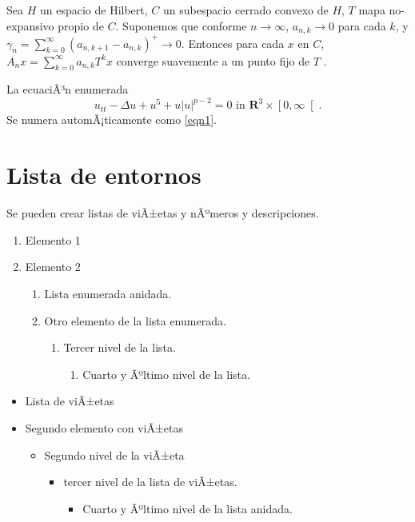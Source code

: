 \documentclass[11pt,spanish]{report}
\begin{document}
Sea $H$ un espacio de Hilbert, $C$ un subespacio cerrado convexo de $H$, $T$
mapa no-expansivo propio de $C$. Suponemos que conforme $n\rightarrow\infty$,
$a_{n,k}\rightarrow0$ para cada $k$, y $\gamma_{n}=\sum_{k=0}^{\infty}\left(
a_{n,k+1}-a_{n,k}\right)  ^{+}\rightarrow0.$ Entonces para cada $x$ en $C$,
$A_{n}x=\sum_{k=0}^{\infty}a_{n,k}T^{k}x$ converge suavemente a un punto fijo de $T$ .

La ecuaciÃ³n enumerada
\begin{equation}
u_{tt}-\Delta u+u^{5}+u\left|  u\right|  ^{p-2}=0\text{ in }\mathbf{R}
^{3}\times\left[  0,\infty\right[  .\label{eqn1}
\end{equation}
Se numera automÃ¡ticamente como \ref{eqn1}.

\section{Lista de entornos}

Se pueden crear listas de viÃ±etas y nÃºmeros y descripciones.

\begin{enumerate}
\item Elemento 1

\item Elemento 2

\begin{enumerate}
\item Lista enumerada anidada.

\item Otro elemento de la lista enumerada.

\begin{enumerate}
\item Tercer nivel de la lista.

\begin{enumerate}
\item Cuarto y Ãºltimo nivel de la lista.
\end{enumerate}
\end{enumerate}
\end{enumerate}
\end{enumerate}

\begin{itemize}
\item Lista de viÃ±etas

\item Segundo elemento con viÃ±etas

\begin{itemize}
\item Segundo nivel de la viÃ±eta

\begin{itemize}
\item tercer nivel de la lista de viÃ±etas.

\begin{itemize}
\item Cuarto y Ãºltimo nivel de la lista anidada.
\end{itemize}
\end{itemize}
\end{itemize}
\end{itemize}
\end{document}
